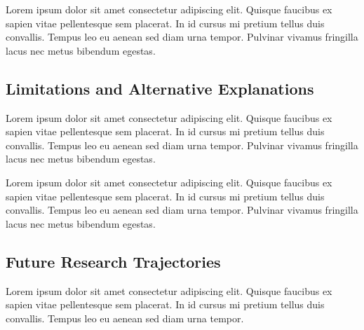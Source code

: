 \documentclass[sigconf,nonacm]{acmart} %
\begin{document}
Lorem ipsum dolor sit amet consectetur adipiscing elit. 
Quisque faucibus ex sapien vitae pellentesque sem placerat. 
In id cursus mi pretium tellus duis convallis. 
Tempus leo eu aenean sed diam urna tempor. 
Pulvinar vivamus fringilla lacus nec metus bibendum egestas. 

\subsection{Limitations and Alternative Explanations}
\label{subsec:limitations}

Lorem ipsum dolor sit amet consectetur adipiscing elit. 
Quisque faucibus ex sapien vitae pellentesque sem placerat. 
In id cursus mi pretium tellus duis convallis. 
Tempus leo eu aenean sed diam urna tempor. 
Pulvinar vivamus fringilla lacus nec metus bibendum egestas. 

Lorem ipsum dolor sit amet consectetur adipiscing elit. 
Quisque faucibus ex sapien vitae pellentesque sem placerat. 
In id cursus mi pretium tellus duis convallis. 
Tempus leo eu aenean sed diam urna tempor. 
Pulvinar vivamus fringilla lacus nec metus bibendum egestas. 

\subsection{Future Research Trajectories}
\label{subsec:future_directions}

Lorem ipsum dolor sit amet consectetur adipiscing elit. 
Quisque faucibus ex sapien vitae pellentesque sem placerat. 
In id cursus mi pretium tellus duis convallis. 
Tempus leo eu aenean sed diam urna tempor. 
\end{document}
